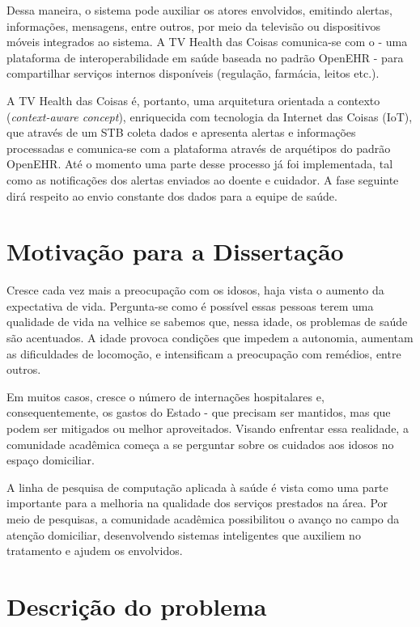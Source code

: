 Dessa maneira, o sistema pode auxiliar os atores envolvidos, emitindo alertas,
informações, mensagens, entre outros, por meio da televisão ou dispositivos móveis
integrados ao sistema. A TV Health das Coisas comunica-se com o \nextsaude[] - uma
plataforma de interoperabilidade em saúde baseada no padrão OpenEHR - para
compartilhar serviços internos disponíveis (regulação, farmácia, leitos etc.).

A TV Health das Coisas é, portanto, uma arquitetura orientada a contexto
(\textit{context-aware concept}), enriquecida com tecnologia da Internet das
Coisas (IoT), que através de um STB coleta dados e apresenta alertas e
informações processadas e comunica-se com a plataforma \nextsaude[] através de
arquétipos do padrão OpenEHR.  Até o momento uma parte desse processo já foi
implementada, tal como as notificações dos alertas enviados ao doente e
cuidador. A fase seguinte dirá respeito ao envio constante dos dados para a
equipe de saúde.

\section{Motivação para a Dissertação}\label{sec:motivacao}

Cresce cada vez mais a preocupação com os idosos, haja vista o aumento
da expectativa de vida. Pergunta-se como é possível essas pessoas terem uma
qualidade de vida na velhice se sabemos que, nessa idade, os problemas de saúde
são acentuados. A idade provoca condições que impedem a autonomia, aumentam as
dificuldades de locomoção, e intensificam a preocupação com remédios, entre
outros.

Em muitos casos, cresce o número de internações hospitalares e,
consequentemente, os gastos do Estado - que precisam ser mantidos, mas que
podem ser mitigados ou melhor aproveitados.  Visando enfrentar essa realidade,
a comunidade acadêmica começa a se perguntar sobre os cuidados aos idosos no
espaço domiciliar.

A linha de pesquisa de computação aplicada à saúde é vista como uma parte
importante para a melhoria na qualidade dos serviços prestados na área. Por meio
de pesquisas, a comunidade acadêmica possibilitou o avanço no campo da atenção
domiciliar, desenvolvendo sistemas inteligentes que auxiliem no tratamento e
ajudem os envolvidos.

\section{Descrição do problema}\label{sec:descricao-problema}

